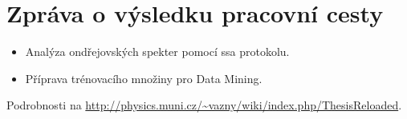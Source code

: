 \documentclass{article}
\begin{document}
\title{}
\author{Jaroslav Vážný}

\section*{Zpráva o výsledku pracovní cesty}

\begin{itemize}
\item Analýza ondřejovských spekter pomocí ssa protokolu. 
\item Příprava trénovacího množiny pro Data Mining. 
\end{itemize}


\noindent Podrobnosti na \url{http://physics.muni.cz/~vazny/wiki/index.php/ThesisReloaded}.

\bigskip

\end{document}
